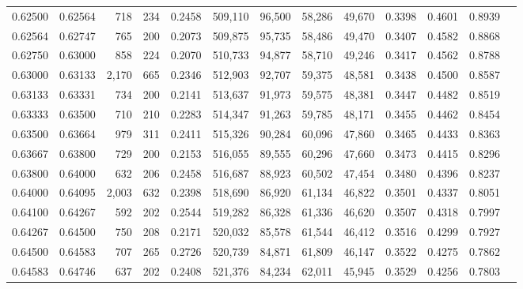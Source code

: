 \begin{tabular}{rrrrrrrrrrrrr}
0.62500 & 0.62564 &   718 & 234 &                                     0.2458 & 509,110 &  96,500 &  58,286 &  49,670 & 0.3398 & 0.4601 & 0.8939 \\
0.62564 & 0.62747 &   765 & 200 &                                     0.2073 & 509,875 &  95,735 &  58,486 &  49,470 & 0.3407 & 0.4582 & 0.8868 \\
0.62750 & 0.63000 &   858 & 224 &                                     0.2070 & 510,733 &  94,877 &  58,710 &  49,246 & 0.3417 & 0.4562 & 0.8788 \\
0.63000 & 0.63133 & 2,170 & 665 &                                     0.2346 & 512,903 &  92,707 &  59,375 &  48,581 & 0.3438 & 0.4500 & 0.8587 \\
0.63133 & 0.63331 &   734 & 200 &                                     0.2141 & 513,637 &  91,973 &  59,575 &  48,381 & 0.3447 & 0.4482 & 0.8519 \\
0.63333 & 0.63500 &   710 & 210 &                                     0.2283 & 514,347 &  91,263 &  59,785 &  48,171 & 0.3455 & 0.4462 & 0.8454 \\
0.63500 & 0.63664 &   979 & 311 &                                     0.2411 & 515,326 &  90,284 &  60,096 &  47,860 & 0.3465 & 0.4433 & 0.8363 \\
0.63667 & 0.63800 &   729 & 200 &                                     0.2153 & 516,055 &  89,555 &  60,296 &  47,660 & 0.3473 & 0.4415 & 0.8296 \\
0.63800 & 0.64000 &   632 & 206 &                                     0.2458 & 516,687 &  88,923 &  60,502 &  47,454 & 0.3480 & 0.4396 & 0.8237 \\
0.64000 & 0.64095 & 2,003 & 632 &                                     0.2398 & 518,690 &  86,920 &  61,134 &  46,822 & 0.3501 & 0.4337 & 0.8051 \\
0.64100 & 0.64267 &   592 & 202 &                                     0.2544 & 519,282 &  86,328 &  61,336 &  46,620 & 0.3507 & 0.4318 & 0.7997 \\
0.64267 & 0.64500 &   750 & 208 &                                     0.2171 & 520,032 &  85,578 &  61,544 &  46,412 & 0.3516 & 0.4299 & 0.7927 \\
0.64500 & 0.64583 &   707 & 265 &                                     0.2726 & 520,739 &  84,871 &  61,809 &  46,147 & 0.3522 & 0.4275 & 0.7862 \\
0.64583 & 0.64746 &   637 & 202 &                                     0.2408 & 521,376 &  84,234 &  62,011 &  45,945 & 0.3529 & 0.4256 & 0.7803 \\

\end{tabular}
